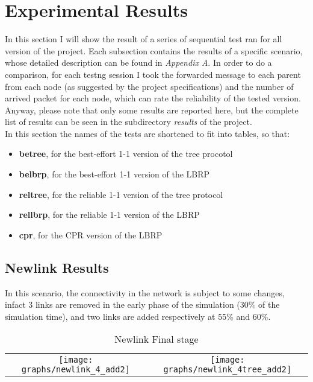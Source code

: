 \documentclass{article}
\begin{document}
\section{Experimental Results}
	In this section I will show the result of a series of sequential test ran for all version of the project. Each subsection contains the results of a specific scenario, whose detailed description can be found in \emph{Appendix A}. In order to do a comparison, for each testng session I took the forwarded message to each parent from each node (as suggested by the project specifications) and the number of arrived packet for each node, which can rate the reliability of the tested version. Anyway, please note that only some results are reported here, but the complete list of results can be seen in the subdirectory \textit{results} of the project.
\\In this section the names of the tests are shortened to fit into tables, so that:
	\begin{itemize}
		\item \textbf{betree}, for the best-effort 1-1 version of the tree procotol
		\item \textbf{belbrp}, for the best-effort 1-1 version of the LBRP
		\item \textbf{reltree}, for the reliable 1-1 version of the tree protocol
		\item \textbf{rellbrp}, for the reliable 1-1 version of the LBRP
		\item \textbf{cpr}, for the CPR version of the LBRP
	\end{itemize}
	\subsection{Newlink Results}
In this scenario, the connectivity in the network is subject to some changes, infact 3 links are removed in the early phase of the simulation (30\% of the simulation time), and two links are added respectively at 55\% and 60\%.

		\begin{table}[H]
			\centering
			\begin{tabular}{cc}
				\texttt{[image: graphs/newlink\_4\_add2]}&\texttt{[image: graphs/newlink\_4tree\_add2]}\\
			\end{tabular}
			\caption{Newlink Final stage}
			\label{tab:comparisonNewlink}
		\end{table}
		
\end{document}

